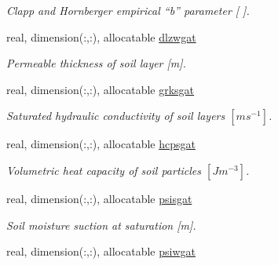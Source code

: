 \begin{DoxyCompactItemize}
\begin{DoxyCompactList}\small\item\em Clapp and Hornberger empirical “b” parameter \mbox{[} \mbox{]}. \end{DoxyCompactList}\item 
\hypertarget{structclass__statevars_1_1class__gather_a1147d8eb647136e8ef05f8ebbe0a1430}{}real, dimension(\+:,\+:), allocatable \hyperlink{structclass__statevars_1_1class__gather_a1147d8eb647136e8ef05f8ebbe0a1430}{dlzwgat}\label{structclass__statevars_1_1class__gather_a1147d8eb647136e8ef05f8ebbe0a1430}

\begin{DoxyCompactList}\small\item\em Permeable thickness of soil layer \mbox{[}m\mbox{]}. \end{DoxyCompactList}\item 
\hypertarget{structclass__statevars_1_1class__gather_a2956b284bc2e5cb4b59b1ef195abb3bd}{}real, dimension(\+:,\+:), allocatable \hyperlink{structclass__statevars_1_1class__gather_a2956b284bc2e5cb4b59b1ef195abb3bd}{grksgat}\label{structclass__statevars_1_1class__gather_a2956b284bc2e5cb4b59b1ef195abb3bd}

\begin{DoxyCompactList}\small\item\em Saturated hydraulic conductivity of soil layers $[m s^{-1} ]$. \end{DoxyCompactList}\item 
\hypertarget{structclass__statevars_1_1class__gather_a0b521f00485da7a7064a8a5408bf43ba}{}real, dimension(\+:,\+:), allocatable \hyperlink{structclass__statevars_1_1class__gather_a0b521f00485da7a7064a8a5408bf43ba}{hcpsgat}\label{structclass__statevars_1_1class__gather_a0b521f00485da7a7064a8a5408bf43ba}

\begin{DoxyCompactList}\small\item\em Volumetric heat capacity of soil particles $[J m^{-3} ]$. \end{DoxyCompactList}\item 
\hypertarget{structclass__statevars_1_1class__gather_a576e568950e46fb0e6a30f32a7a1a4aa}{}real, dimension(\+:,\+:), allocatable \hyperlink{structclass__statevars_1_1class__gather_a576e568950e46fb0e6a30f32a7a1a4aa}{psisgat}\label{structclass__statevars_1_1class__gather_a576e568950e46fb0e6a30f32a7a1a4aa}

\begin{DoxyCompactList}\small\item\em Soil moisture suction at saturation \mbox{[}m\mbox{]}. \end{DoxyCompactList}\item 
\hypertarget{structclass__statevars_1_1class__gather_a0d1e41d8ca74f17680c5894afdd7980b}{}real, dimension(\+:,\+:), allocatable \hyperlink{structclass__statevars_1_1class__gather_a0d1e41d8ca74f17680c5894afdd7980b}{psiwgat}\label{structclass__statevars_1_1class__gather_a0d1e41d8ca74f17680c5894afdd7980b}


\end{DoxyCompactItemize}
